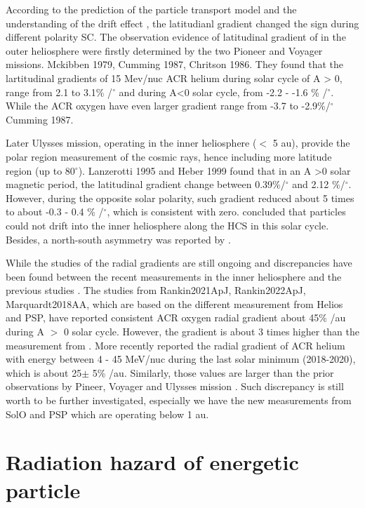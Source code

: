According to the prediction of the particle transport model and the understanding of the drift effect , the latitudianl gradient changed the sign during different polarity \ac{SC}. The observation evidence of latitudinal gradient of in the outer heliosphere were firstly determined by the two Pioneer and Voyager missions. {Mckibben 1979, Cumming 1987, Chritson 1986}. They found that the lartitudinal gradients of 15 Mev/nuc \ac{ACR} helium during solar cycle of A > 0, range from 2.1 to 3.1\% /$^\circ$ and during A<0 solar cycle, from -2.2 - -1.6 \% /$^\circ$. While the ACR oxygen have even larger gradient range from -3.7 to -2.9\%/$^\circ$ {Cumming 1987}.

Later Ulysses mission, operating in the inner heliosphere ($<$ 5 au),  provide the polar region measurement of the cosmic rays, hence including more latitude region (up to 80$^\circ$). Lanzerotti 1995 and Heber 1999 found that in an A >0 solar magnetic period, the latitudinal gradient change between  0.39\%/$^\circ$ and 2.12 \%/$^\circ$. However, during the opposite solar polarity, such gradient reduced about 5 times to about -0.3 - 0.4 \% /$^\circ$, which is consistent with zero. \citep{Cummings2009GeoRL} concluded that particles could not drift into the inner heliosphere along the \ac{HCS} in this solar cycle. Besides, a north-south asymmetry was reported by \citep{Simpson1996ApJ}.

While the studies of the radial gradients are still ongoing and discrepancies have been found between the recent measurements in the inner heliosphere and the previous studies \citep{Webber1981JGR, Marsden1999AdSpR}. The studies from {Rankin2021ApJ, Rankin2022ApJ, Marquardt2018AA}, which are based on the different measurement from Helios and \ac{PSP}, have reported consistent ACR oxygen radial gradient about 45\% /au during A $>$ 0 solar cycle. However, the gradient is about 3 times higher than the measurement from \citet{Webber1981JGR}. More recently \citet{Rankin2022ApJ} reported the radial gradient of ACR helium with energy between 4 - 45 MeV/nuc during the last solar minimum (2018-2020), which is about 25$\pm$ 5\% /au. Similarly, those values are larger than the prior observations by Pineer, Voyager and Ulysses mission \citep{McDonald2001ICRC, Webber1981JGR, McKibben1989JGR, McDonald1986GeoRL, Cummings1987GeoRL, Cummings1995GeoRL}. Such discrepancy is still worth to be further investigated, especially we have the new measurements from \ac{SolO} and \ac{PSP} which are operating below 1 au.


\section{Radiation hazard of energetic particle}


